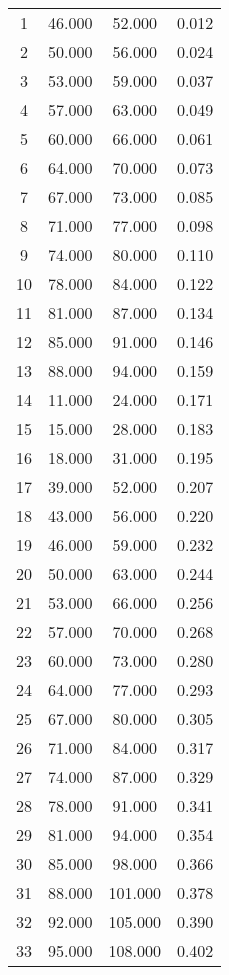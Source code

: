 % 
\begin{tabular}{cccc}
  \hline
  \hline
1 & 46.000 & 52.000 & 0.012 \\ 
  2 & 50.000 & 56.000 & 0.024 \\ 
  3 & 53.000 & 59.000 & 0.037 \\ 
  4 & 57.000 & 63.000 & 0.049 \\ 
  5 & 60.000 & 66.000 & 0.061 \\ 
  6 & 64.000 & 70.000 & 0.073 \\ 
  7 & 67.000 & 73.000 & 0.085 \\ 
  8 & 71.000 & 77.000 & 0.098 \\ 
  9 & 74.000 & 80.000 & 0.110 \\ 
  10 & 78.000 & 84.000 & 0.122 \\ 
  11 & 81.000 & 87.000 & 0.134 \\ 
  12 & 85.000 & 91.000 & 0.146 \\ 
  13 & 88.000 & 94.000 & 0.159 \\ 
  14 & 11.000 & 24.000 & 0.171 \\ 
  15 & 15.000 & 28.000 & 0.183 \\ 
  16 & 18.000 & 31.000 & 0.195 \\ 
  17 & 39.000 & 52.000 & 0.207 \\ 
  18 & 43.000 & 56.000 & 0.220 \\ 
  19 & 46.000 & 59.000 & 0.232 \\ 
  20 & 50.000 & 63.000 & 0.244 \\ 
  21 & 53.000 & 66.000 & 0.256 \\ 
  22 & 57.000 & 70.000 & 0.268 \\ 
  23 & 60.000 & 73.000 & 0.280 \\ 
  24 & 64.000 & 77.000 & 0.293 \\ 
  25 & 67.000 & 80.000 & 0.305 \\ 
  26 & 71.000 & 84.000 & 0.317 \\ 
  27 & 74.000 & 87.000 & 0.329 \\ 
  28 & 78.000 & 91.000 & 0.341 \\ 
  29 & 81.000 & 94.000 & 0.354 \\ 
  30 & 85.000 & 98.000 & 0.366 \\ 
  31 & 88.000 & 101.000 & 0.378 \\ 
  32 & 92.000 & 105.000 & 0.390 \\ 
  33 & 95.000 & 108.000 & 0.402 \\ 

\end{tabular}
